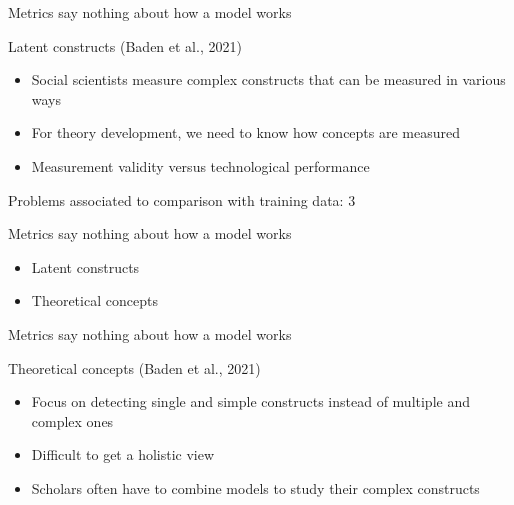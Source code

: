 \documentclass[compress]{beamer}
\begin{document}
\begin{frame}[fragile]{Metrics say nothing about how a model works} 	
	\begin{alertblock}{Latent constructs (Baden et al., 2021)}
		\begin{itemize}
			\item Social scientists measure complex constructs that can be measured in various ways
			\item For theory development, we need to know how concepts are measured
			\item Measurement validity versus technological performance
		\end{itemize}
	\end{alertblock}
\end{frame}


\begin{frame}[fragile]{Problems associated to comparison with training data: 3} 	
	\begin{alertblock}{Metrics say nothing about how a model works}
		\begin{itemize}
			\item Latent constructs
			\item Theoretical concepts
		\end{itemize}
	\end{alertblock}
\end{frame}

\begin{frame}[fragile]{Metrics say nothing about how a model works} 	
	\begin{alertblock}{Theoretical concepts (Baden et al., 2021)}
		\begin{itemize}
			\item Focus on detecting single and simple constructs instead of multiple and complex ones
			\item Difficult to get a holistic view
			\item Scholars often have to combine models to study their complex constructs
		\end{itemize}
	\end{alertblock}
\end{frame}
\end{document}
